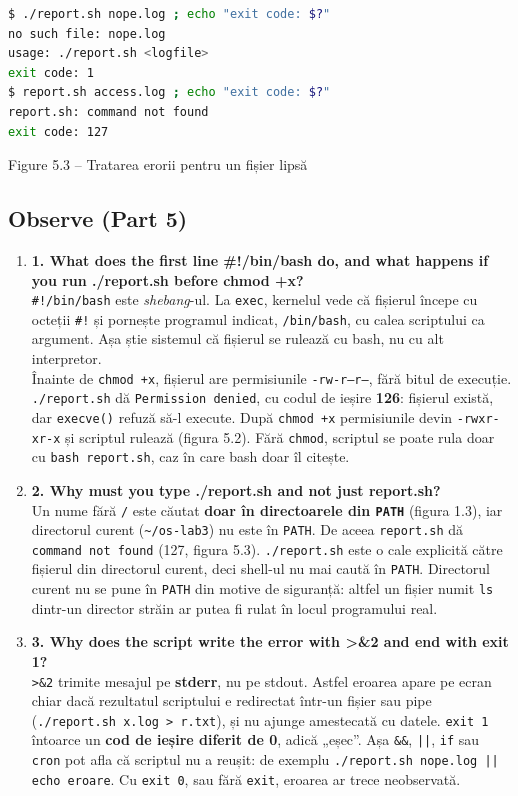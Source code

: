 \documentclass[12pt,a4paper]{article}
\newenvironment{shot}[2]{\def\shotnum{#1}\def\shotcap{#2}\par\medskip\noindent\begin{minipage}{\linewidth}}{\par\vspace{2pt}\centering\small Figure \shotnum{} -- \shotcap\par\end{minipage}\par\medskip}
\newcommand{\Q}[2]{\item \textbf{#1}\\ #2}
\begin{document}
\begin{shot}{5.3}{Tratarea erorii pentru un fișier lipsă}
\begin{lstlisting}[language=bash]
$ ./report.sh nope.log ; echo "exit code: $?"
no such file: nope.log
usage: ./report.sh <logfile>
exit code: 1
$ report.sh access.log ; echo "exit code: $?"
report.sh: command not found
exit code: 127
\end{lstlisting}
\end{shot}

\subsection*{Observe (Part 5)}
\begin{enumerate}
\Q{1. What does the first line \#!/bin/bash do, and what happens if you run ./report.sh before chmod +x?}
{\texttt{\#!/bin/bash} este \emph{shebang}-ul. La \texttt{exec}, kernelul vede că fișierul începe cu octeții \texttt{\#!} și pornește programul indicat, \texttt{/bin/bash}, cu calea scriptului ca argument. Așa știe sistemul că fișierul se rulează cu bash, nu cu alt interpretor.\\
Înainte de \texttt{chmod +x}, fișierul are permisiunile \texttt{-rw-r--r--}, fără bitul de execuție. \texttt{./report.sh} dă \texttt{Permission denied}, cu codul de ieșire \textbf{126}: fișierul există, dar \texttt{execve()} refuză să-l execute. După \texttt{chmod +x} permisiunile devin \texttt{-rwxr-xr-x} și scriptul rulează (figura 5.2). Fără \texttt{chmod}, scriptul se poate rula doar cu \texttt{bash report.sh}, caz în care bash doar îl citește.}
\Q{2. Why must you type ./report.sh and not just report.sh?}
{Un nume fără \texttt{/} este căutat \textbf{doar în directoarele din \texttt{PATH}} (figura 1.3), iar directorul curent (\texttt{\textasciitilde/os-lab3}) nu este în \texttt{PATH}. De aceea \texttt{report.sh} dă \texttt{command not found} (127, figura 5.3). \texttt{./report.sh} este o cale explicită către fișierul din directorul curent, deci shell-ul nu mai caută în \texttt{PATH}. Directorul curent nu se pune în \texttt{PATH} din motive de siguranță: altfel un fișier numit \texttt{ls} dintr-un director străin ar putea fi rulat în locul programului real.}
\Q{3. Why does the script write the error with >\&2 and end with exit 1?}
{\texttt{>\&2} trimite mesajul pe \textbf{stderr}, nu pe stdout. Astfel eroarea apare pe ecran chiar dacă rezultatul scriptului e redirectat într-un fișier sau pipe (\texttt{./report.sh x.log > r.txt}), și nu ajunge amestecată cu datele. \texttt{exit 1} întoarce un \textbf{cod de ieșire diferit de 0}, adică „eșec”. Așa \texttt{\&\&}, \texttt{||}, \texttt{if} sau \texttt{cron} pot afla că scriptul nu a reușit: de exemplu \texttt{./report.sh nope.log || echo eroare}. Cu \texttt{exit 0}, sau fără \texttt{exit}, eroarea ar trece neobservată.}
\end{enumerate}
\end{document}
